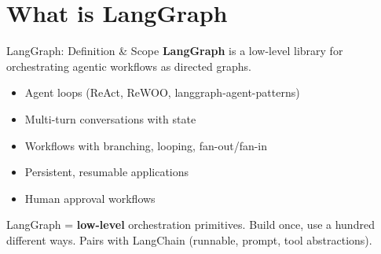\documentclass[aspectratio=169,11pt]{beamer}
\begin{document}
\section{What is LangGraph}
\begin{frame}[t]{LangGraph: Definition \& Scope}
\setlength{\itemsep}{1pt}
\vspace{0.1cm}
\textbf{LangGraph} is a low-level library for orchestrating agentic workflows as directed graphs.

\vspace{0.15cm}

\begin{codebox}
\setlength{\itemsep}{1pt}
\begin{itemize}
  \item Agent loops (ReAct, ReWOO, langgraph-agent-patterns)
  \item Multi-turn conversations with state
  \item Workflows with branching, looping, fan-out/fan-in
  \item Persistent, resumable applications
  \item Human approval workflows
\end{itemize}
\end{codebox}

\vspace{0.15cm}

\begin{tipbox}[Philosophy]
LangGraph = \textbf{low-level} orchestration primitives. Build once, use a hundred different ways. Pairs with LangChain (runnable, prompt, tool abstractions).
\end{tipbox}
\end{frame}
\end{document}
